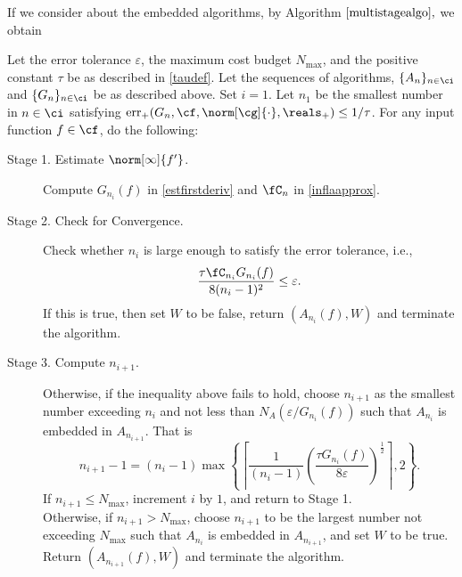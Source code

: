 If we consider about the embedded algorithms, by Algorithm $\ref{multistagealgo},$ we obtain
\begin{algo} \label{multistageapproalgo}
Let the error tolerance $\varepsilon$, the maximum cost budget $N_{\max}$, and the positive constant $\tau$ be as described in  \eqref{taudef}. Let the sequences of algorithms, $\{A_n\}_{n \in \ci}$ and  $\{G_n\}_{n \in \ci}$ be as described above.  Set $i=1$.  Let $n_1$ be the smallest number in $n \in \ci$ satisfying $\err_+(G_n,\cf,\norm[\cg]{\cdot},\reals_+) \le 1/\tau$. For any input function $f \in \cf$, do the following:
\begin{description}

\item [Stage 1. Estimate {$\norm[\infty]{f'} $}.]
Compute $G_{n_i}(f)$ in \eqref{estfirstderiv} and $\fC_n$ in \eqref{inflaapprox}.
\item [Stage 2. Check for Convergence.]
 Check whether $n_i$ is large enough to satisfy the error tolerance, i.e.,
$$
\frac{\tau \fC_{n_i} G_{n_i}(f)}{8(n_i-1)^2} \le \varepsilon.
$$
If this is true, then set $W$ to be false, return $(A_{n_i}(f),W)$ and terminate the algorithm.


\item[Stage 3. Compute $n_{i+1}$.]  Otherwise, if the inequality above fails to hold,
choose $n_{i+1}$ as the smallest number exceeding $n_i$ and not less than $N_{A}(\varepsilon /G_{n_i}(f))$ such that $A_{n_{i}}$ is embedded in $A_{n_{i+1}}$. That is
$$n_{i+1}-1=(n_i-1)\max\left\{\left\lceil\frac{1}{(n_i-1)}\left(\frac{\tau G_{n_i}(f)}{8\varepsilon}\right)^{\frac{1}{2}}\right\rceil,2\right\}.$$
 If $n_{i+1} \le N_{\max}$, increment $i$ by $1$, and return to Stage 1.\\
Otherwise, if $n_{i+1} > N_{\max}$, choose $n_{i+1}$ to be the largest number not exceeding $N_{\max}$ such that $A_{n_{i}}$ is embedded in $A_{n_{i+1}}$, and set $W$ to be true. Return $(A_{n_{i+1}}(f),W)$ and terminate the algorithm.
\end{description}
\end{algo}


